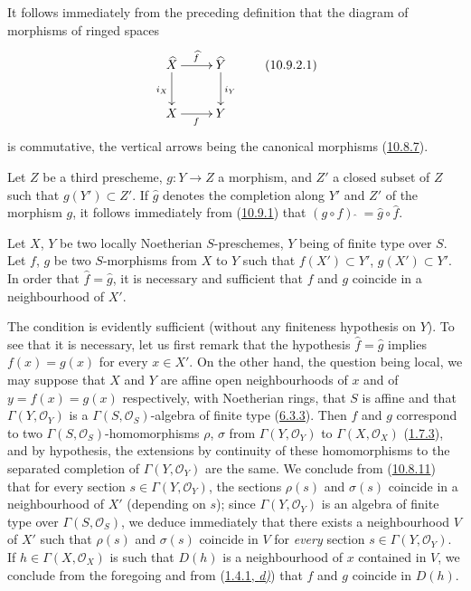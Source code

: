 \begin{env}[10.9.2]
\label{I.10.9.2}
It follows immediately from the preceding definition that the diagram
of morphisms of ringed spaces
\[ \xymatrix{
    \widehat X\ar[r]^{\widehat f}\ar[d]_{i_X} &
    \widehat Y\ar[d]^{i_Y}\\
    X\ar[r]_f &
    Y
  }
\tag{10.9.2.1}\label{I.10.9.2.1}
\]
is commutative, the vertical arrows being the canonical morphisms
(\hyperref[I.10.8.7]{10.8.7}).
\end{env}

\begin{env}[10.9.3]
\label{I.10.9.3}
Let $Z$ be a third prescheme, $g:Y\to Z$ a morphism, and $Z'$ a
closed subset of $Z$ such that $g(Y')\subset Z'$. If $\widehat g$
denotes the completion along $Y'$ and $Z'$ of the morphism $g$, it
follows immediately from (\hyperref[I.10.9.1]{10.9.1}) that
$(g\circ f){\,\widehat{\,}\,}=\widehat g\circ\widehat f$.
\end{env}

\begin{proposition}[10.9.4]
\label{I.10.9.4}
Let $X$, $Y$ be two locally Noetherian $S$-preschemes, $Y$ being of
finite type over $S$. Let $f$, $g$ be two $S$-morphisms from $X$ to $Y$
such that $f(X')\subset Y'$, $g(X')\subset Y'$. In order that
$\widehat f=\widehat g$, it is necessary and sufficient that $f$ and $g$
coincide in a neighbourhood of $X'$.
\end{proposition}

The condition is evidently sufficient (without any finiteness hypothesis
on $Y$). To see that it is necessary, let us first remark that the
hypothesis $\widehat f=\widehat g$ implies $f(x)=g(x)$ for every
$x\in X'$. On the other hand, the question being local, we may suppose
that $X$ and $Y$ are affine open neighbourhoods of $x$ and of
$y=f(x)=g(x)$ respectively, with Noetherian rings, that $S$ is affine and
that $\Gamma(Y,\mathscr{O}_Y)$ is a $\Gamma(S,\mathscr{O}_S)$-algebra of
finite type (\hyperref[I.6.3.3]{6.3.3}). Then $f$ and $g$ correspond
to two $\Gamma(S,\mathscr{O}_S)$-homomorphisms $\rho$, $\sigma$ from
$\Gamma(Y,\mathscr{O}_Y)$ to $\Gamma(X,\mathscr{O}_X)$
(\hyperref[I.1.7.3]{1.7.3}), and by hypothesis, the extensions by
continuity of these homomorphisms to the separated completion of
$\Gamma(Y,\mathscr{O}_Y)$ are the same. We conclude from
(\hyperref[I.10.8.11]{10.8.11}) that for every section
$s\in\Gamma(Y,\mathscr{O}_Y)$, the sections $\rho(s)$ and $\sigma(s)$
coincide in a neighbourhood of $X'$ (depending on $s$); since
$\Gamma(Y,\mathscr{O}_Y)$ is an algebra of finite type over
$\Gamma(S,\mathscr{O}_S)$, we deduce immediately that there exists a
neighbourhood $V$ of $X'$ such that $\rho(s)$ and $\sigma(s)$ coincide in
$V$ for \emph{every} section $s\in\Gamma(Y,\mathscr{O}_Y)$. If
$h\in\Gamma(X,\mathscr{O}_X)$ is such that $D(h)$ is a neighbourhood of
$x$ contained in $V$, we conclude from the foregoing and from
(\hyperref[I.1.4.1]{1.4.1, \emph{d)}}) that $f$ and $g$ coincide in $D(h)$.

